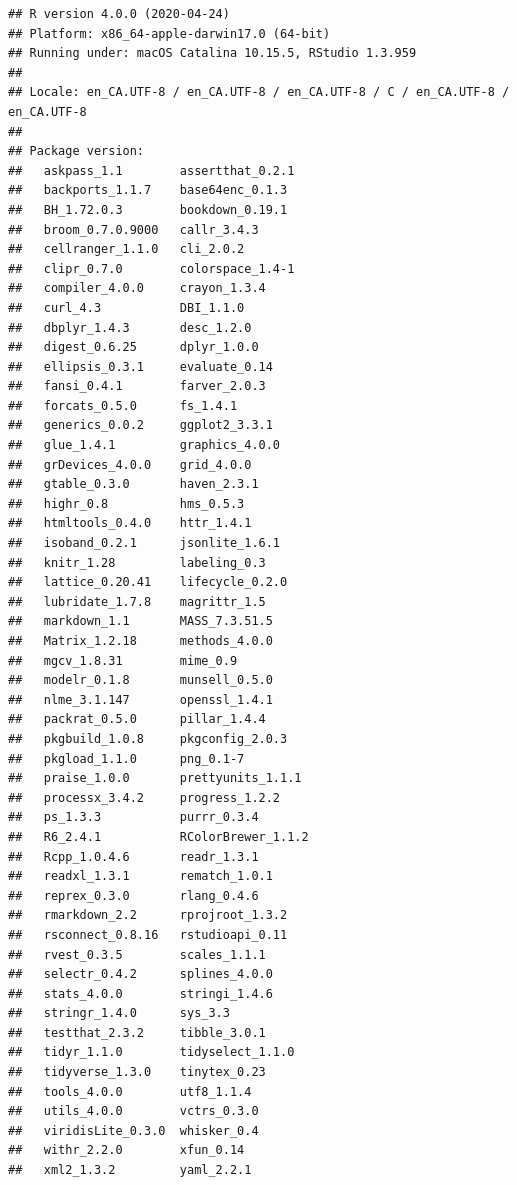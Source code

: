 \documentclass[
]{krantz}
\begin{document}
\begin{verbatim}
## R version 4.0.0 (2020-04-24)
## Platform: x86_64-apple-darwin17.0 (64-bit)
## Running under: macOS Catalina 10.15.5, RStudio 1.3.959
## 
## Locale: en_CA.UTF-8 / en_CA.UTF-8 / en_CA.UTF-8 / C / en_CA.UTF-8 / en_CA.UTF-8
## 
## Package version:
##   askpass_1.1        assertthat_0.2.1  
##   backports_1.1.7    base64enc_0.1.3   
##   BH_1.72.0.3        bookdown_0.19.1   
##   broom_0.7.0.9000   callr_3.4.3       
##   cellranger_1.1.0   cli_2.0.2         
##   clipr_0.7.0        colorspace_1.4-1  
##   compiler_4.0.0     crayon_1.3.4      
##   curl_4.3           DBI_1.1.0         
##   dbplyr_1.4.3       desc_1.2.0        
##   digest_0.6.25      dplyr_1.0.0       
##   ellipsis_0.3.1     evaluate_0.14     
##   fansi_0.4.1        farver_2.0.3      
##   forcats_0.5.0      fs_1.4.1          
##   generics_0.0.2     ggplot2_3.3.1     
##   glue_1.4.1         graphics_4.0.0    
##   grDevices_4.0.0    grid_4.0.0        
##   gtable_0.3.0       haven_2.3.1       
##   highr_0.8          hms_0.5.3         
##   htmltools_0.4.0    httr_1.4.1        
##   isoband_0.2.1      jsonlite_1.6.1    
##   knitr_1.28         labeling_0.3      
##   lattice_0.20.41    lifecycle_0.2.0   
##   lubridate_1.7.8    magrittr_1.5      
##   markdown_1.1       MASS_7.3.51.5     
##   Matrix_1.2.18      methods_4.0.0     
##   mgcv_1.8.31        mime_0.9          
##   modelr_0.1.8       munsell_0.5.0     
##   nlme_3.1.147       openssl_1.4.1     
##   packrat_0.5.0      pillar_1.4.4      
##   pkgbuild_1.0.8     pkgconfig_2.0.3   
##   pkgload_1.1.0      png_0.1-7         
##   praise_1.0.0       prettyunits_1.1.1 
##   processx_3.4.2     progress_1.2.2    
##   ps_1.3.3           purrr_0.3.4       
##   R6_2.4.1           RColorBrewer_1.1.2
##   Rcpp_1.0.4.6       readr_1.3.1       
##   readxl_1.3.1       rematch_1.0.1     
##   reprex_0.3.0       rlang_0.4.6       
##   rmarkdown_2.2      rprojroot_1.3.2   
##   rsconnect_0.8.16   rstudioapi_0.11   
##   rvest_0.3.5        scales_1.1.1      
##   selectr_0.4.2      splines_4.0.0     
##   stats_4.0.0        stringi_1.4.6     
##   stringr_1.4.0      sys_3.3           
##   testthat_2.3.2     tibble_3.0.1      
##   tidyr_1.1.0        tidyselect_1.1.0  
##   tidyverse_1.3.0    tinytex_0.23      
##   tools_4.0.0        utf8_1.1.4        
##   utils_4.0.0        vctrs_0.3.0       
##   viridisLite_0.3.0  whisker_0.4       
##   withr_2.2.0        xfun_0.14         
##   xml2_1.3.2         yaml_2.2.1
\end{verbatim}
\end{document}
